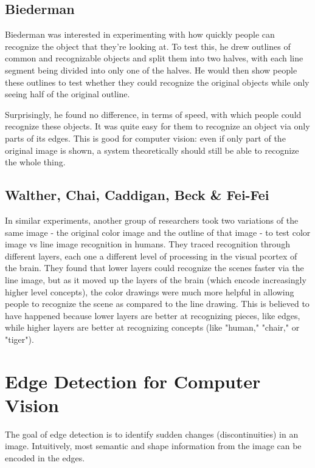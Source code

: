 \documentclass{article}
\begin{document}
\subsection{Biederman}
Biederman was interested in experimenting with how quickly people can recognize the object that they're looking at. To test this, he drew outlines of common and recognizable objects and split them into two halves, with each line segment being divided into only one of the halves. He would then show people these outlines to test whether they could recognize the original objects while only seeing half of the original outline. \newline

Surprisingly, he found no difference, in terms of speed, with which people could recognize these objects. It was quite easy for them to recognize an object via only parts of its edges. This is good for computer vision: even if only part of the original image is shown, a system theoretically should still be able to recognize the whole thing.

\subsection{Walther, Chai, Caddigan, Beck \& Fei-Fei}
In similar experiments, another group of researchers took two variations of the same image - the original color image and the outline of that image - to test color image vs line image recognition in humans. They traced recognition through different layers, each one a different level of processing in the visual pcortex of the brain. They found that lower layers could recognize the scenes faster via the line image, but as it moved up the layers of the brain (which encode increasingly higher level concepts), the color drawings were much more helpful in allowing people to recognize the scene as compared to the line drawing. This is believed to have happened because lower layers are better at recognizing pieces, like edges, while higher layers are better at recognizing concepts (like "human," "chair," or "tiger").


\section{Edge Detection for Computer Vision}
The goal of edge detection is to identify sudden changes (discontinuities) in an image. Intuitively, most semantic and shape information from the image can be encoded in the edges. \newline
\end{document}
